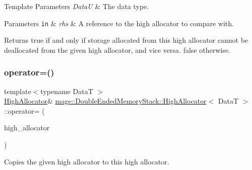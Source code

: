 \begin{DoxyTemplParams}{Template Parameters}
{\em DataU} & The data type. \\
\hline
\end{DoxyTemplParams}

\begin{DoxyParams}[1]{Parameters}
\mbox{\tt in}  & {\em rhs} & A reference to the high allocator to compare with. \\
\hline
\end{DoxyParams}
\begin{DoxyReturn}{Returns}
{\ttfamily true} if and only if storage allocated from this high allocator cannot be deallocated from the given high allocator, and vice versa. {\ttfamily false} otherwise. 
\end{DoxyReturn}
\mbox{\label{classmage_1_1_double_ended_memory_stack_1_1_high_allocator_ab9d94cbf9334b14208006202746e9077}} 
\subsubsection{\texorpdfstring{operator=()}{operator=()}\hspace{0.1cm}{\footnotesize\ttfamily [1/2]}}
{\footnotesize\ttfamily template$<$typename DataT $>$ \\
\mbox{\hyperlink{classmage_1_1_double_ended_memory_stack_1_1_high_allocator}{High\+Allocator}}\& \mbox{\hyperlink{classmage_1_1_double_ended_memory_stack_1_1_high_allocator}{mage\+::\+Double\+Ended\+Memory\+Stack\+::\+High\+Allocator}}$<$ DataT $>$\+::operator= (\begin{DoxyParamCaption}\item[{const \mbox{\hyperlink{classmage_1_1_double_ended_memory_stack_1_1_high_allocator}{High\+Allocator}}$<$ DataT $>$ \&}]{high\+\_\+allocator }\end{DoxyParamCaption})\hspace{0.3cm}{\ttfamily [delete]}}

Copies the given high allocator to this high allocator.


